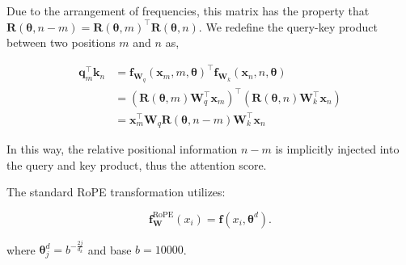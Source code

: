 \documentclass{article}
\begin{document}


Due to the arrangement of frequencies, this matrix has the property that $\mathbf{R}(\bm{\theta},n - m) = \mathbf{R}(\bm{\theta},m)^\top\mathbf{R}(\bm{\theta},n)$. We redefine the query-key product between two positions $m$ and $n$ as, 

\begin{align}
\mathbf{q}^\top_m{\mathbf{k}_n}&=\mathbf{f}_{\mathbf{W}_q}(\mathbf{x}_m, m, \bm{\theta})^\top\mathbf{f}_{\mathbf{W}_k}(\mathbf{x}_n, n, \bm{\theta}) \\ 
& = \left(\mathbf{R}({\bm{\theta},m})\mathbf{W}^\top_q\mathbf{x}_m \right)^\top \left( \mathbf{R}(\bm{\theta},n)\mathbf{W}^\top_k\mathbf{x}_n \right) \\
&= \mathbf{x}_m^\top\mathbf{W}_q \mathbf{R}(\bm{\theta},n - m) \mathbf{W}_k^\top\mathbf{x}_n 
\end{align}

In this way, the relative positional information $n-m$
is implicitly injected into the query and key product, thus the attention score.

The standard RoPE transformation utilizes: 

\begin{equation}
\mathbf{f}_\mathbf{W}^{\text{RoPE}}(x_i) = \mathbf{f}(x_i, \bm{\theta}^d).
\end{equation}

where $\bm{\theta}^d_j = b^{-\frac{2j}{d_k}}$ and base $b=10000$. 
\end{document}
